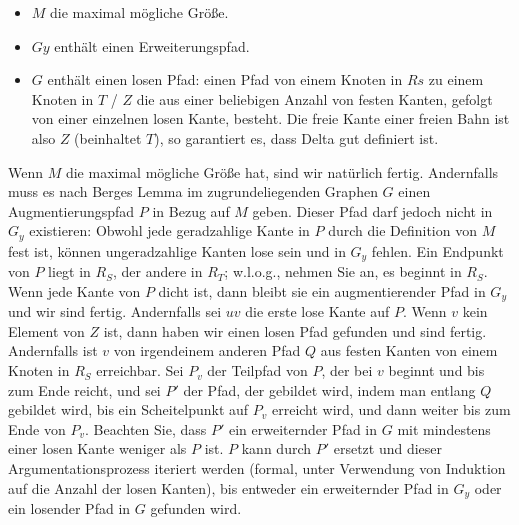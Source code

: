 \begin{itemize}
\item
$M$ die maximal mögliche Größe.
\item
$Gy$ enthält einen Erweiterungspfad.
\item
$G$ enthält einen losen Pfad: einen Pfad von einem Knoten in $Rs$
zu einem Knoten in $T$ / $Z$ die aus einer beliebigen Anzahl von
festen Kanten, gefolgt von einer einzelnen losen Kante, besteht.
Die freie Kante einer freien Bahn ist also $Z$ (beinhaltet $T$),
so garantiert es, dass Delta gut definiert ist.
\end{itemize}
Wenn $M$ die maximal mögliche Größe hat, sind wir natürlich fertig.
Andernfalls muss es nach Berges Lemma im zugrundeliegenden Graphen
$G$ einen Augmentierungspfad $P$ in Bezug auf $M$ geben.
Dieser Pfad darf jedoch nicht in $G_y$ existieren: Obwohl jede
geradzahlige Kante in $P$ durch die Definition von $M$ fest ist,
können ungeradzahlige Kanten lose sein und in $G_y$ fehlen.
Ein Endpunkt von $P$ liegt in $R_{S}$, der andere in $R_T$; w.l.o.g.,
nehmen Sie an, es beginnt in $R_{S}$.
Wenn jede Kante von $P$ dicht ist, dann bleibt sie ein augmentierender
Pfad in $G_y$ und wir sind fertig.
Andernfalls sei $uv$ die erste lose Kante auf $P$.
Wenn $v$ kein Element von $Z$ ist, dann haben wir einen losen Pfad
gefunden und sind fertig.
Andernfalls ist $v$ von irgendeinem anderen Pfad $Q$ aus festen
Kanten von einem Knoten in $R_{S}$ erreichbar.
Sei $P_{v}$ der Teilpfad von $P$, der bei $v$ beginnt und bis zum
Ende reicht, und sei $P'$ der Pfad, der gebildet wird, indem man
entlang $Q$ gebildet wird, bis ein Scheitelpunkt auf $P_{v}$ erreicht
wird, und dann weiter bis zum Ende von $P_{v}$.
Beachten Sie, dass $P'$ ein erweiternder Pfad in $G$ mit mindestens
einer losen Kante weniger als $P$ ist.
$P$ kann durch $P'$ ersetzt und dieser Argumentationsprozess iteriert
werden (formal, unter Verwendung von Induktion auf die Anzahl der
losen Kanten), bis entweder ein erweiternder Pfad in $G_y$ oder ein
losender Pfad in $G$ gefunden wird.

